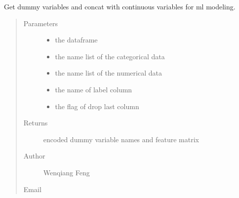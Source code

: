 \documentclass[letterpaper,11pt,english]{sphinxmanual}
\begin{document}
\begin{fulllineitems}
\begin{fulllineitems}
\end{fulllineitems}


\begin{fulllineitems}
\label{\detokenize{auto_feature:AutoFeatures.AutoFeatures.get_dummy}}
Get dummy variables and concat with continuous variables for ml modeling.
\begin{quote}\begin{description}
\item[{Parameters}] \leavevmode\begin{itemize}
\item {} 
 \textendash{} the dataframe

\item {} 
 \textendash{} the name list of the categorical data

\item {} 
 \textendash{} the name list of the numerical data

\item {} 
 \textendash{} the name of label column

\item {} 
 \textendash{} the flag of drop last column

\end{itemize}

\item[{Returns}] \leavevmode
encoded dummy variable names and feature matrix

\item[{Author}] \leavevmode
Wenqiang Feng

\item[{Email}] \leavevmode
{}

\end{description}\end{quote}


\end{fulllineitems}
\end{fulllineitems}
\end{document}
